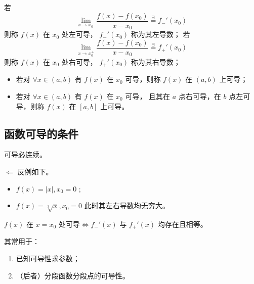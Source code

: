 \begin{Def}[左、右导数]

    若$$
        {\displaystyle\lim_{x\rightarrow x_0^-}}\frac{f(x)-f(x_0)}{x-x_0}\mathop{=}\limits^\exists f_-'(x_0)
    $$ 
    则称 $ f(x) $ 在  $ x_0 $ 处左可导， $ f_-'(x_0) $ 称为其左导数；
    若$$
    {\displaystyle\lim_{x\rightarrow x_0^+}}\frac{f(x)-f(x_0)}{x-x_0}\mathop{=}\limits^\exists f_+'(x_0)
$$ 
则称 $ f(x) $ 在  $ x_0 $ 处右可导， $ f_+'(x_0) $ 称为其右导数；
\end{Def}

\begin{Field}[函数在区间上的可导性]

    \begin{itemize}
        \item 若对 $ \forall x\in (a,b) $ 有 $ f(x) $ 在 $ x_0 $ 可导，则称 $ f(x) $ 在 $ (a,b) $ 上可导；
        \item 若对 $ \forall x\in (a,b) $ 有 $ f(x) $ 在 $ x_0 $ 可导，
        且其在 $ a $ 点右可导，在 $ b $ 点左可导，则称 $ f(x) $ 在 $ [a,b] $ 上可导。
    \end{itemize}
\end{Field}

\subsection{函数可导的条件}

\begin{Theo}[函数可导的必要条件]

    可导必连续。
\end{Theo}
$ \Leftarrow $ 反例如下。
\begin{itemize}
    \item $ f(x)=|x|,x_0=0 $ ;
    \item $ f(x)=\sqrt[3]x,x_0=0 $ 此时其左右导数均无穷大。
\end{itemize}

\begin{Theo}[函数可导的充要条件]

    $ f(x) $ 在 $ x=x_0 $ 处可导$ \Leftrightarrow f_-'(x) $ 与 $ f_+'(x) $  均存在且相等。
\end{Theo}

其常用于：\begin{enumerate}
    \item 已知可导性求参数；
    \item （后者）分段函数分段点的可导性。
\end{enumerate}

